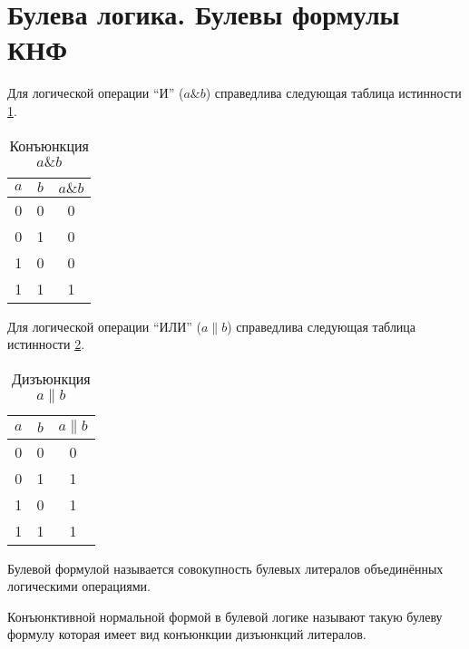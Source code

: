 \section{Булева логика. Булевы формулы КНФ}

\begin{definition}
Для логической операции ``И'' ($a \& b$) справедлива следующая таблица
истинности \ref{tblAddAlgoAND}.
\begin{table}
\centering
\begin{tabular}{|c|c|c|}
\hline
$a$ & $b$ & $a \& b$ \\ \hline
0  & 0 & 0 \\
0  & 1 & 0 \\
1  & 0 & 0 \\
1  & 1 & 1 \\ \hline
\end{tabular}
\caption{Конъюнкция $a \& b$}
\label{tblAddAlgoAND}
\end{table}
\end{definition}

\begin{definition}
Для логической операции ``ИЛИ'' ($a \| b$) справедлива следующая таблица
истинности \ref{tblAddAlgoOR}.
\begin{table}
\centering
\begin{tabular}{|c|c|c|}
\hline
$a$ & $b$ & $a \| b$ \\ \hline
0  & 0 & 0 \\
0  & 1 & 1 \\
1  & 0 & 1 \\
1  & 1 & 1 \\ \hline
\end{tabular}
\caption{Дизъюнкция $a \| b$}
\label{tblAddAlgoOR}
\end{table}
\end{definition}

\begin{definition}
Булевой формулой называется совокупность булевых литералов
объединённых логическими операциями.
\end{definition}

\begin{definition}
Конъюнктивной нормальной формой в булевой логике называют такую булеву
формулу которая имеет вид конъюнкции дизъюнкций литералов.
\end{definition}

